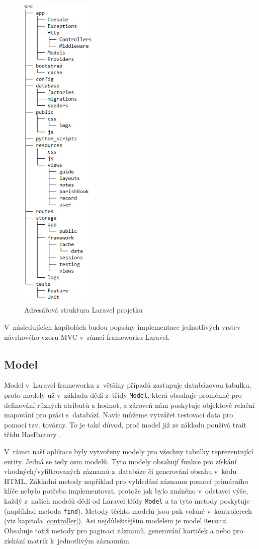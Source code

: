 \begin{figure}[H]
	\centering
	\includegraphics[width=37mm]{obrazky-figures/struktura.png}
	\caption[Adresářová struktura Laravel projetku]{Adresářová struktura Laravel projetku}
	\label{figure_structure}
\end{figure}

V~následujících kapitolách budou popsány implementace jednotlivých vrstev návrhového vzoru MVC v~rámci frameworku Laravel.
\subsection{Model}
Model v~Laravel frameworku z~většiny případů zastupuje databázovou tabulku, proto modely už v~základu dědí z~třídy \verb|Model|, která obsahuje proměnné pro definování různých atributů a hodnot, a zároveň nám poskytuje objektově relační mapování pro práci s~databází. Navíc můžeme vytvářet testovací data pro pomocí tzv. továrny. To je také důvod, proč model již ze základu používá trait třídu HasFactory \cite{Laravel1}.

V~rámci naší aplikace byly vytvořeny modely pro všechny tabulky reprezentující entity. Jedná se tedy osm modelů. Tyto modely obsahují funkce pro získání vhodných/vyfiltrovaných záznamů z~databáze či generování obsahu v~kódu HTML. Základní metody například pro vyhledání záznamu pomocí primárního klíče nebylo potřeba implementovat, protože jak bylo zmíněno v~odstavci výše, každý z~našich modelů dědí od Laravel třídy \verb|Model| a ta tyto metody poskytuje (například metoda \verb|find|). Metody těchto modelů jsou pak volané v~kontrolerech (viz kapitola \ref{controller}). Asi nejdůležitějším modelem je model \verb|Record|. Obsahuje totiž metody pro paginaci záznamů, generování kartiček a nebo pro získání matrik k~jednotlivým záznamům.

